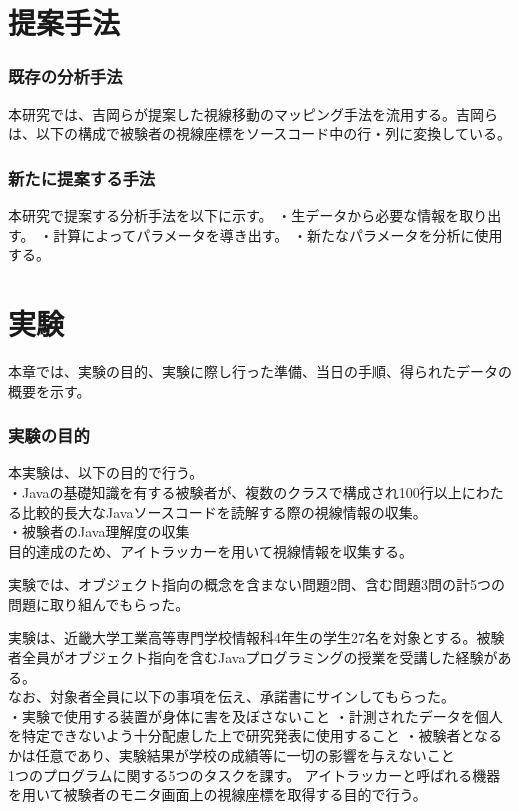 \documentclass[paper=a4paper,fontsize=10pt]{jlreq}
\begin{document}
\clearpage

\part{提案手法}
  \section{既存の分析手法}
  本研究では、吉岡らが提案した視線移動のマッピング手法を流用する。吉岡らは、以下の構成で被験者の視線座標をソースコード中の行・列に変換している。\\
  

  \section{新たに提案する手法}
  本研究で提案する分析手法を以下に示す。
  ・生データから必要な情報を取り出す。
  ・計算によってパラメータを導き出す。
  ・新たなパラメータを分析に使用する。

\clearpage

\part{実験}
  本章では、実験の目的、実験に際し行った準備、当日の手順、得られたデータの概要を示す。\\

  \section{実験の目的}
  本実験は、以下の目的で行う。\\
  ・Javaの基礎知識を有する被験者が、複数のクラスで構成され100行以上にわたる比較的長大なJavaソースコードを読解する際の視線情報の収集。\\
  ・被験者のJava理解度の収集\\

  目的達成のため、アイトラッカーを用いて視線情報を収集する。

  実験では、オブジェクト指向の概念を含まない問題2問、含む問題3問の計5つの問題に取り組んでもらった。

  実験は、近畿大学工業高等専門学校情報科4年生の学生27名を対象とする。被験者全員がオブジェクト指向を含むJavaプログラミングの授業を受講した経験がある。\\
  なお、対象者全員に以下の事項を伝え、承諾書にサインしてもらった。\\
  ・実験で使用する装置が身体に害を及ぼさないこと
  ・計測されたデータを個人を特定できないよう十分配慮した上で研究発表に使用すること
  ・被験者となるかは任意であり、実験結果が学校の成績等に一切の影響を与えないこと
  \\
  1つのプログラムに関する5つのタスクを課す。
  アイトラッカーと呼ばれる機器を用いて被験者のモニタ画面上の視線座標を取得する目的で行う。
  
\end{document}
